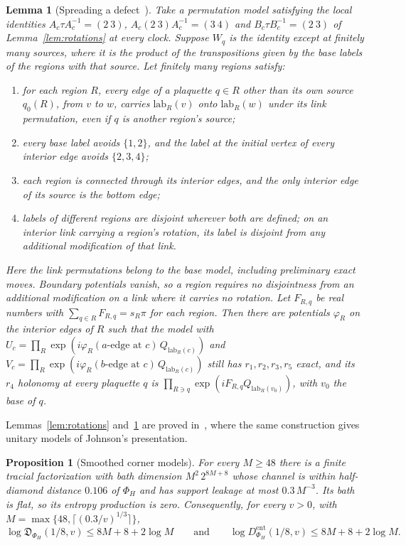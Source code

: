 \documentclass[11pt,a4paper]{article}
\theoremstyle{plain}
\newtheorem{proposition}[theorem]{Proposition}
\newtheorem{lemma}[theorem]{Lemma}
\theoremstyle{definition}
\theoremstyle{remark}
\newcommand{\Dsupp}{\mathfrak{D}}
\begin{document}
\begin{lemma}[Spreading a defect~{\cite[Lemma~6.4]{DouglasMghirbiA}}]\label{lem:spreading}
Take a permutation model satisfying the local identities
$A_c\tau A_c^{-1}=(2\ 3)$, $A_c(2\ 3)A_c^{-1}=(3\ 4)$ and $B_c\tau B_c^{-1}=(2\ 3)$ of Lemma~\ref{lem:rotations} at every clock.
Suppose $W_q$ is the identity except at finitely many sources, where it is the
product of the transpositions given by the base labels of the regions with that source. Let finitely many regions satisfy:
\begin{enumerate}[label=(R\arabic*),itemsep=0pt]
\item for each region $R$, every edge of a plaquette $q\in R$ other than its own source $q_0(R)$, from $v$ to $w$, carries $\mathrm{lab}_R(v)$ onto $\mathrm{lab}_R(w)$ under its link permutation, even if $q$ is another region's source;
\item every base label avoids $\{1,2\}$, and the label at the initial vertex of every interior edge avoids $\{2,3,4\}$;
\item each region is connected through its interior edges, and the only interior edge of its source is the bottom edge;
\item labels of different regions are disjoint wherever both are defined; on an interior link carrying a region's rotation, its label is disjoint from any additional modification of that link.
\end{enumerate}
Here the link permutations belong to the base model, including preliminary exact moves. Boundary potentials vanish, so a region
requires no disjointness from an additional modification on a link where it carries no rotation.
Let $F_{R,q}$ be real numbers with $\sum_{q\in R}F_{R,q}=s_R\pi$ for each region. Then there are potentials $\varphi_R$ on the interior
edges of $R$ such that the model with $U_c=\prod_R\exp(i\varphi_R(\text{$a$-edge at }c)\,Q_{\mathrm{lab}_R(c)})$ and
$V_c=\prod_R\exp(i\varphi_R(\text{$b$-edge at }c)\,Q_{\mathrm{lab}_R(c)})$ still has $r_1,r_2,r_3,r_5$ exact, and its $r_4$ holonomy at
every plaquette $q$ is $\prod_{R\ni q}\exp(iF_{R,q}Q_{\mathrm{lab}_R(v_0)})$, with $v_0$ the base of $q$.
\end{lemma}

Lemmas~\ref{lem:rotations} and~\ref{lem:spreading} are proved in~\cite[Section~6.2]{DouglasMghirbiA}, where the same construction gives unitary models of
Johnson's presentation.

\begin{proposition}[Smoothed corner models]\label{prop:smoothed}
For every $M\ge48$ there is a finite tracial factorization with bath dimension $M^2\,2^{8M+8}$ whose channel is within half-diamond
distance $0.106$ of $\Phi_H$ and has support leakage at most $0.3\,M^{-3}$. Its bath is flat, so its entropy production is zero.
Consequently, for every $v>0$, with $M=\max\{48,\lceil(0.3/v)^{1/3}\rceil\}$,
\[
\log\Dsupp_{\Phi_H}(1/8,v)\le8M+8+2\log M\qquad\text{and}\qquad\log D^{\mathrm{ent}}_{\Phi_H}(1/8,v)\le8M+8+2\log M.
\]
\end{proposition}
\end{document}
